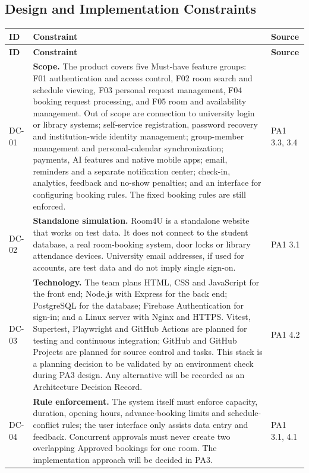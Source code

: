 \subsection{Design and Implementation Constraints}
\begingroup
\small
{}
\setlength{\tabcolsep}{4pt}
\renewcommand{\arraystretch}{1.15}
\begin{longtable}{|>{\raggedright\arraybackslash}p{}|>{\raggedright\arraybackslash}p{}|>{\raggedright\arraybackslash}p{}|}
\hline
\textbf{ID} & \textbf{Constraint} & \textbf{Source} \\ \hline
\endfirsthead
\hline
\textbf{ID} & \textbf{Constraint} & \textbf{Source} \\ \hline
\endhead
\hline
\endfoot
\hline
\endlastfoot
DC-01 & \textbf{Scope.} The product covers five Must-have feature groups: F01 authentication and access control, F02 room search and schedule viewing, F03 personal request management, F04 booking request processing, and F05 room and availability management. Out of scope are connection to university login or library systems; self-service registration, password recovery and institution-wide identity management; group-member management and personal-calendar synchronization; payments, AI features and native mobile apps; email, reminders and a separate notification center; check-in, analytics, feedback and no-show penalties; and an interface for configuring booking rules. The fixed booking rules are still enforced. & PA1 3.3, 3.4 \\ \hline
DC-02 & \textbf{Standalone simulation.} Room4U is a standalone website that works on test data. It does not connect to the student database, a real room-booking system, door locks or library attendance devices. University email addresses, if used for accounts, are test data and do not imply single sign-on. & PA1 3.1 \\ \hline
DC-03 & \textbf{Technology.} The team plans HTML, CSS and JavaScript for the front end; Node.js with Express for the back end; PostgreSQL for the database; Firebase Authentication for sign-in; and a Linux server with Nginx and HTTPS. Vitest, Supertest, Playwright and GitHub Actions are planned for testing and continuous integration; GitHub and GitHub Projects are planned for source control and tasks. This stack is a planning decision to be validated by an environment check during PA3 design. Any alternative will be recorded as an Architecture Decision Record. & PA1 4.2 \\ \hline
DC-04 & \textbf{Rule enforcement.} The system itself must enforce capacity, duration, opening hours, advance-booking limits and schedule-conflict rules; the user interface only assists data entry and feedback. Concurrent approvals must never create two overlapping Approved bookings for one room. The implementation approach will be decided in PA3. & PA1 3.1, 4.1 \\ \hline

\end{longtable}
